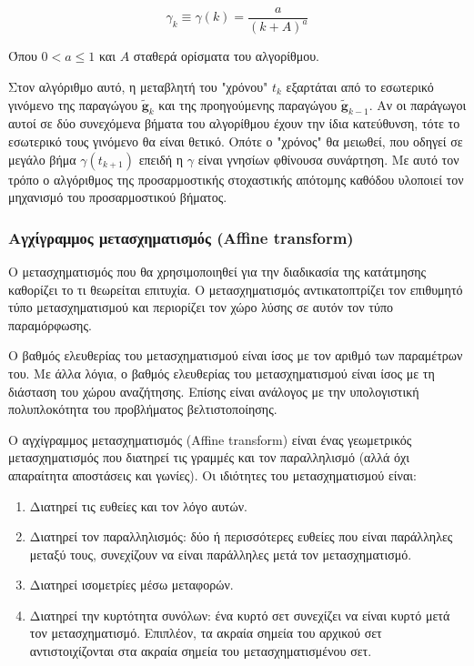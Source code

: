 \documentclass[a4paper,12pt]{article}
\begin{document}
\begin{equation*}
    \gamma_k \equiv \gamma(k) = \frac {a} {(k+A)^a}
\end{equation*}

Όπου $0 < a \leq 1$ και $A$ σταθερά ορίσματα του αλγορίθμου.

Στον αλγόριθμο αυτό, η μεταβλητή του "χρόνου" $t_k$ εξαρτάται από το εσωτερικό
γινόμενο της παραγώγου $\widetilde{\bm{g}}_{k}$ και της προηγούμενης παραγώγου
$\widetilde{\bm{g}}_{k-1}$. Αν οι παράγωγοι αυτοί σε δύο συνεχόμενα βήματα του
αλγορίθμου έχουν την ίδια κατεύθυνση, τότε  το εσωτερικό τους γινόμενο θα είναι
θετικό. Οπότε ο "χρόνος" θα μειωθεί, που οδηγεί σε μεγάλο βήμα
$\gamma(t_{k+1})$ επειδή η $\gamma$ είναι γνησίων φθίνουσα συνάρτηση. Με αυτό
τον τρόπο ο αλγόριθμος της προσαρμοστικής στοχαστικής απότομης καθόδου υλοποιεί
τον μηχανισμό του προσαρμοστικού βήματος.

\subsubsection{Αγχίγραμμος μετασχηματισμός (Affine transform)}
\label{reg:affine:1}

Ο μετασχηματισμός που θα χρησιμοποιηθεί για την διαδικασία της κατάτμησης
καθορίζει το τι θεωρείται επιτυχία. Ο μετασχηματισμός αντικατοπτρίζει τον
επιθυμητό τύπο μετασχηματισμού και περιορίζει τον χώρο λύσης σε αυτόν τον τύπο
παραμόρφωσης.

Ο βαθμός ελευθερίας του μετασχηματισμού είναι ίσος με τον αριθμό των παραμέτρων
του. Με άλλα λόγια, ο βαθμός ελευθερίας του μετασχηματισμού είναι ίσος με τη
διάσταση του χώρου αναζήτησης. Επίσης είναι ανάλογος με την υπολογιστική
πολυπλοκότητα του προβλήματος βελτιστοποίησης.

Ο αγχίγραμμος μετασχηματισμός (Affine transform) είναι ένας γεωμετρικός
μετασχηματισμός που διατηρεί τις γραμμές και τον παραλληλισμό (αλλά όχι
απαραίτητα αποστάσεις και γωνίες). Οι ιδιότητες του μετασχηματισμού είναι:

\begin{enumerate}
    \item Διατηρεί τις ευθείες και τον λόγο αυτών.
    \item Διατηρεί τον παραλληλισμός: δύο ή περισσότερες ευθείες που είναι
        παράλληλες μεταξύ τους, συνεχίζουν να είναι παράλληλες μετά τον
        μετασχηματισμό.
    \item Διατηρεί ισομετρίες μέσω μεταφορών. 
    \item Διατηρεί την κυρτότητα συνόλων: ένα κυρτό σετ συνεχίζει να είναι κυρτό
        μετά τον μετασχηματισμό. Επιπλέον, τα ακραία σημεία του αρχικού σετ
        αντιστοιχίζονται στα ακραία σημεία του μετασχηματισμένου σετ.
\end{enumerate}
\end{document}
